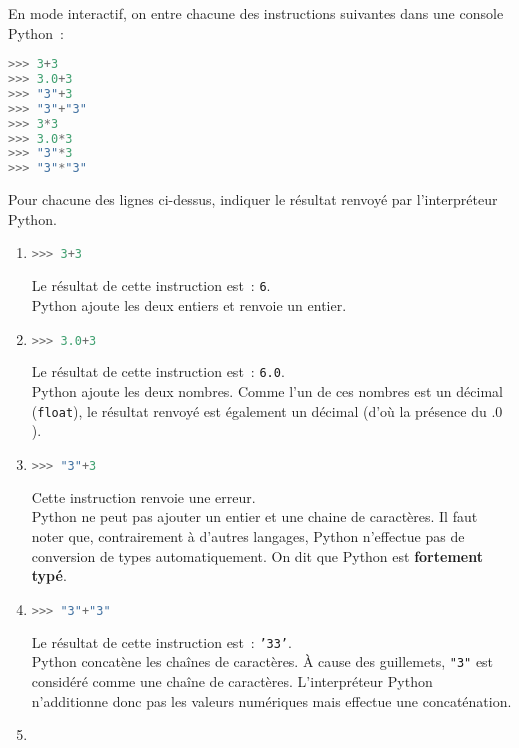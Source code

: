 
\par
En mode interactif, on entre chacune des instructions suivantes dans une console Python~:
\begin{lstlisting}[language=Python]
>>> 3+3
>>> 3.0+3
>>> "3"+3
>>> "3"+"3"
>>> 3*3
>>> 3.0*3
>>> "3"*3
>>> "3"*"3"
\end{lstlisting}
Pour chacune des lignes ci-dessus, indiquer le résultat renvoyé par l'interpréteur Python.
\begin{corrige}
     \begin{enumerate}
          \item %
\begin{lstlisting}[language=Python]
>>> 3+3
     \end{lstlisting}
     Le résultat de cette instruction est~: \texttt{6}.\\
     Python ajoute les deux entiers et renvoie un entier.
     \item %
\begin{lstlisting}[language=Python]
>>> 3.0+3
\end{lstlisting}
Le résultat de cette instruction est~: \texttt{6.0}.\\
Python ajoute les deux nombres. Comme l'un de ces nombres est un décimal (\texttt{float}), le résultat renvoyé est également un décimal (d'où la présence du \og .0 \fg{} ).
\item %
\begin{lstlisting}[language=Python]
>>> "3"+3
\end{lstlisting}
Cette instruction renvoie une erreur.\\
Python ne peut pas ajouter un entier et une chaine de caractères. Il faut noter que, contrairement à d'autres langages, Python n'effectue pas de conversion de types automatiquement. On dit que Python est \textbf{fortement typé}.
\item %
\begin{lstlisting}[language=Python]
>>> "3"+"3"
\end{lstlisting}
Le résultat de cette instruction est~: \texttt{'33'}.\\
Python concatène les chaînes de caractères. À cause des guillemets, \texttt{"3"} est considéré comme une chaîne de caractères.  L'interpréteur Python n'additionne donc pas les valeurs numériques mais effectue une concaténation.
\item %
\begin{lstlisting}[language=Python]

\end{lstlisting}
\end{enumerate}
\end{corrige}
